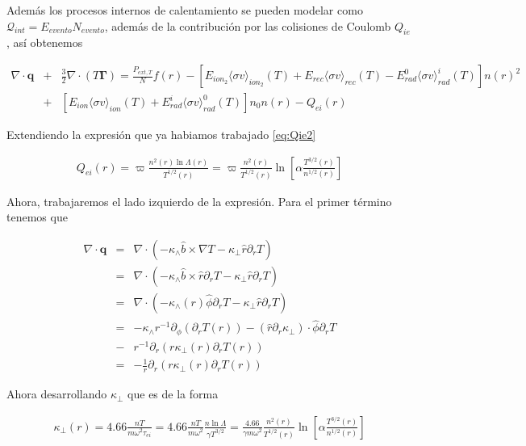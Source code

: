 Además los procesos internos de calentamiento se pueden modelar como $\mathcal{Q}_{int} = E_{evento}N_{evento}$, además de la contribuci\'on por las colisiones de Coulomb $Q_{ie}$, as\'i obtenemos

\begin{eqnarray}
  \nabla\cdot\textbf{q} &+& \frac{3}{2}\nabla\cdot(T\pmb{\Gamma}) = \frac{P_{ext,T}}{N}f(r) -  [E_{ion_2}\langle\sigma v\rangle_{ion_2}(T) + E_{rec}\langle \sigma v\rangle_{rec}(T) - E_{rad}^0\langle\sigma v\rangle_{rad}^i(T)]n(r)^2 \nonumber \\ &+& [E_{ion}\langle\sigma v\rangle_{ion}(T)+ E_{rad}^i\langle\sigma v\rangle_{rad}^0(T)]n_0n(r) - Q_{ei}(r)
\end{eqnarray}

Extendiendo la expresi\'on que ya habiamos trabajado \eqref{eq:Qie2}

\begin{eqnarray*}
  Q_{ei}(r) = \varpi \frac{n^2(r)\ln{\Lambda}(r)}{T^{1/2}(r)} = \varpi\frac{n^2(r)}{T^{1/2}(r)}\ln\left[\alpha \frac{T^{3/2}(r)}{n^{1/2}(r)}\right]
\end{eqnarray*}

Ahora, trabajaremos el lado izquierdo de la expresi\'on. Para el primer t\'ermino tenemos que

\begin{eqnarray}
  \nabla\cdot\textbf{q} &=& \nabla\cdot(-\kappa_\wedge\hat{b}\times\nabla T - \kappa_\perp\hat{r}\partial_r T) \nonumber\\
                        &=& \nabla\cdot(-\kappa_\wedge\hat{b}\times\hat{r}\partial_r T - \kappa_\perp\hat{r}\partial_r T) \nonumber \\
                        &=& \nabla\cdot(-\kappa_\wedge(r)\hat{\phi}\partial_r T - \kappa_\perp\hat{r}\partial_r T) \nonumber\\
                        &=& -\kappa_\wedge r^{-1} \partial_\phi (\partial_r T(r)) - (\hat{r} \partial_r \kappa_\perp)\cdot \hat{\phi}\partial_r T \nonumber\\ 
                        &-& r^{-1}\partial_r(r \kappa_\perp (r) \partial_r T(r)) \nonumber\\
                        &=& - \frac{1}{r}\partial_r(r \kappa_\perp (r) \partial_r T(r))
\end{eqnarray}

Ahora desarrollando $\kappa_\perp$ que es de la forma \cite{helander2005}

\begin{eqnarray} 
  \kappa_\perp(r) = 4.66\frac{nT}{m\omega^2\tau_{ei}} = 4.66\frac{nT}{m\omega^2}\frac{n\ln\Lambda}{\gamma T^{3/2}} = \frac{4.66}{\gamma m\omega^2}\frac{n^2(r)}{T^{1/2}(r)}\ln\left[\alpha \frac{T^{3/2}(r)}{n^{1/2}(r)}\right]
\end{eqnarray}

